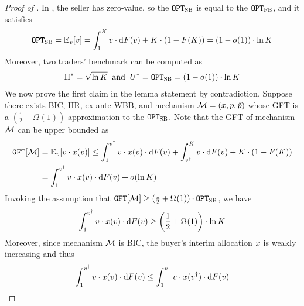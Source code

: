 \begin{proof}[Proof of ]
    In , the seller has zero-value, so the {\SecondBest} $\texttt{OPT}_{\textsc{SB}}$ is equal to the {\FirstBest} $\texttt{OPT}_{\textsc{FB}}$, and it  satisfies
    \begin{align*}
        \OPTSB = \expect[\val]{\val} =
        \displaystyle\int_1^{\constantH} \val\cdot \d \buyercdf(\val)
        + \constantH\cdot (1 - \buyercdf(\constantH))
        =
        (1 - o_{}(1))\cdot \ln \constantH
    \end{align*}
    Moreover, two traders' benchmark can be computed as
    \begin{align*}
        \Pi^* = \sqrt{\ln K}
        \;\;
        \mbox{and}
        \;\;
        U^* = \texttt{OPT}_{\textsc{SB}} = (1 - o_{}(1))\cdot \ln K
    \end{align*}
    We now prove the first claim in the lemma statement by contradiction. Suppose there exists BIC, IIR, ex ante WBB, and {\ksfair} mechanism $\mathcal{M} = (x,p,\tilde{p})$ whose GFT is a $(\frac{1}{2} + \Omega_{}(1))$-approximation to the {\SecondBest} $\texttt{OPT}_{\textsc{SB}}$.
    Note that the GFT of mechanism $\mathcal{M}$ can be upper bounded as
    \begin{align*}
        \GFT{\mech} & = \expect[\val]{\val\cdot \alloc(\val)} 
        \leq
        \displaystyle\int_1^{\val\primed} \val\cdot \alloc(\val)\cdot \d \buyercdf(\val)
        +
        \displaystyle\int_{\val\primed}^{\constantH} \val\cdot \d \buyercdf(\val)
        + \constantH\cdot (1 - \buyercdf(\constantH))
        \\
        &{}=
        \displaystyle\int_1^{\val\primed} \val\cdot \alloc(\val)\cdot \d \buyercdf(\val)
        +
        o_{}(\ln\constantH)
    \end{align*}
    Invoking the assumption that $\GFT{\mech} \geq (\frac{1}{2} + \Omega_{}(1))\cdot \OPTSB$, we have 
    \begin{align*}
        \displaystyle\int_1^{v^\dagger} v\cdot x(v)\cdot \mathrm{d} F(v) 
        \geq
        \left(\frac{1}{2} + \Omega_{}(1)\right)
        \cdot \ln K
    \end{align*}
    Moreover, since mechanism $\mathcal{M}$ is BIC, the buyer's interim allocation $x$ is weakly increasing and thus
    \begin{align*}
        \displaystyle\int_1^{\val\primed} \val\cdot \alloc(\val)\cdot \d \buyercdf(\val)
        \leq 
        \displaystyle\int_1^{\val\primed} \val\cdot \alloc(\val\primed)\cdot \d \buyercdf(\val)

\end{align*}
\end{proof}
